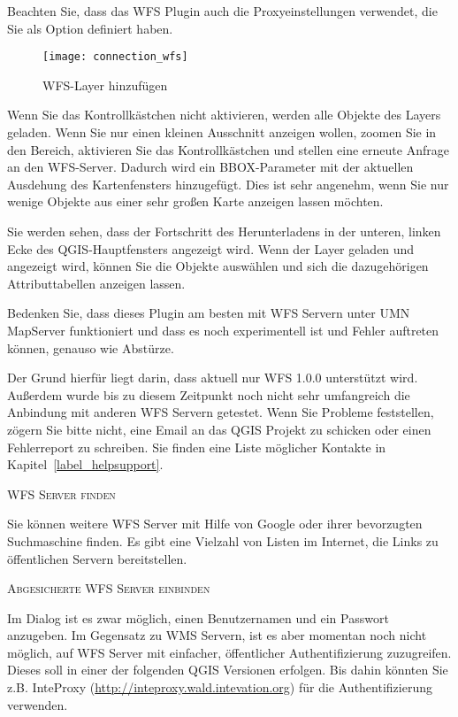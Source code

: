 Beachten Sie, dass das WFS Plugin auch die Proxyeinstellungen verwendet, die
Sie als Option definiert haben.

\begin{figure}[ht]
  \begin{center}
  	\caption{WFS-Layer hinzufügen \nixcaption}\label{fig:wfs_dmsolutions}
	\texttt{[image: connection\_wfs]}
  \end{center}
\end{figure}

Wenn Sie das Kontrollkästchen  nicht aktivieren, werden alle Objekte des Layers geladen. Wenn 
Sie nur einen kleinen Ausschnitt anzeigen wollen, zoomen Sie in den Bereich, 
aktivieren Sie das Kontrollkästchen und stellen eine erneute Anfrage an den 
WFS-Server. Dadurch wird ein BBOX-Parameter mit der aktuellen Ausdehung des 
Kartenfensters hinzugefügt. Dies ist sehr angenehm, wenn Sie nur wenige Objekte 
aus einer sehr großen Karte anzeigen lassen möchten. 

Sie werden sehen, dass der Fortschritt des Herunterladens in der unteren,
linken Ecke des QGIS-Hauptfensters angezeigt wird. Wenn der Layer geladen und
angezeigt wird, können Sie die Objekte auswählen und sich die dazugehörigen
Attributtabellen anzeigen lassen.

Bedenken Sie, dass dieses Plugin am besten mit WFS Servern unter UMN
MapServer funktioniert und dass es noch experimentell ist und Fehler auftreten
können, genauso wie Abstürze.

Der Grund hierfür liegt darin, dass aktuell nur WFS 1.0.0 unterstützt wird.
Außerdem wurde bis zu diesem Zeitpunkt noch nicht sehr umfangreich die
Anbindung mit anderen WFS Servern getestet. Wenn Sie Probleme feststellen,
zögern Sie bitte nicht, eine Email an das QGIS Projekt zu schicken oder einen
Fehlerreport zu schreiben. Sie finden eine Liste möglicher Kontakte in
Kapitel~\ref{label_helpsupport}.

\begin{Tip}[h]\caption{\textsc{WFS Server finden}}
Sie können weitere WFS Server mit Hilfe von Google oder
ihrer bevorzugten Suchmaschine finden. Es gibt eine Vielzahl von Listen im
Internet, die Links zu öffentlichen Servern bereitstellen.
\end{Tip}

\begin{Tip}[ht]\caption{\textsc{Abgesicherte WFS Server einbinden}}
Im Dialog  ist es zwar möglich, einen
Benutzernamen und ein Passwort anzugeben. Im Gegensatz zu WMS Servern, ist es
aber momentan noch nicht möglich, auf WFS Server mit einfacher, öffentlicher
Authentifizierung zuzugreifen. Dieses soll in einer der folgenden QGIS
Versionen erfolgen. Bis dahin könnten Sie z.B. InteProxy 
(\url{http://inteproxy.wald.intevation.org}) für die Authentifizierung
verwenden.
\end{Tip}

\FloatBarrier

